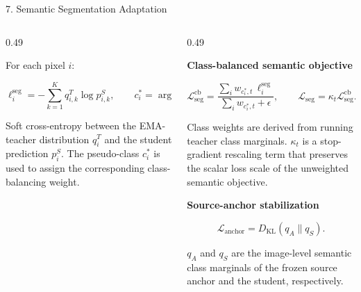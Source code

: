 \documentclass[aspectratio=169,11pt]{beamer}
\begin{document}
\begin{frame}{7. Semantic Segmentation Adaptation}
\begin{columns}[T,onlytextwidth]
\begin{column}{0.49\textwidth}
\vspace{-0.08cm}

For each pixel $i$:

\vspace{-0.5cm}

\[
\ell^{\mathrm{seg}}_i
=
-\sum_{k=1}^{K}
q^T_{i,k}\log p^S_{i,k},
\qquad
c_i^\ast=\arg\max_k q^T_{i,k}.
\]

\vspace{-0.10cm}

{\fontsize{5.6}{6.0}\selectfont
Soft cross-entropy between the EMA-teacher distribution
$q^T_i$ and the student prediction $p^S_i$.
The pseudo-class $c_i^\ast$ is used to assign the corresponding
class-balancing weight.
}

\end{column}


\begin{column}{0.49\textwidth}

\textbf{Class-balanced semantic objective}


\[
\mathcal{L}^{\mathrm{cb}}_{\mathrm{seg}}
=
\frac{
\sum_i w_{c_i^\ast,t}\,
\ell^{\mathrm{seg}}_i
}{
\sum_i w_{c_i^\ast,t}+\epsilon
},
\qquad
\mathcal{L}_{\mathrm{seg}}
=
\kappa_t
\mathcal{L}^{\mathrm{cb}}_{\mathrm{seg}}.
\]


{\fontsize{5.5}{5.9}\selectfont
Class weights are derived from running teacher class marginals.
$\kappa_t$ is a stop-gradient rescaling term that preserves the
scalar loss scale of the unweighted semantic objective.
}


\textbf{Source-anchor stabilization}

\vspace{-0.3cm}

\[
\mathcal{L}_{\mathrm{anchor}}
=
D_{\mathrm{KL}}
\!\left(
q_A\parallel q_S
\right).
\]

% 
{\fontsize{5.5}{5.9}\selectfont
$q_A$ and $q_S$ are the image-level semantic class marginals of the
frozen source anchor and the student, respectively.
}

\end{column}

\end{columns}

\end{frame}
\end{document}

